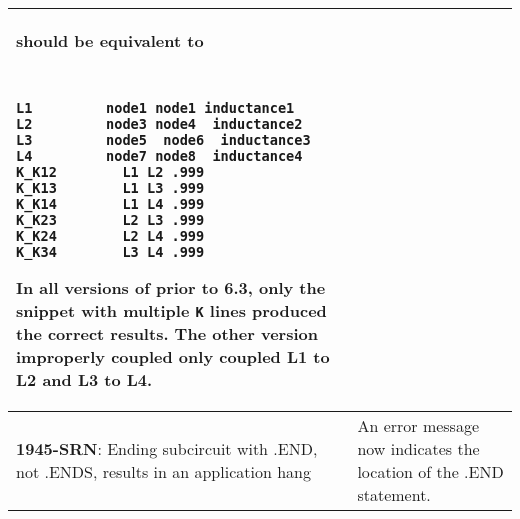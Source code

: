 \begin{longtable}[h] {>{\raggedright\small}m{2in}|>{\raggedright\let\\\tabularnewline\small}m{3.5in}}
should be equivalent to
{\tt
\begin{verbatim}
L1         node1 node1 inductance1
L2         node3 node4  inductance2
L3         node5  node6  inductance3
L4         node7 node8  inductance4
K_K12        L1 L2 .999
K_K13        L1 L3 .999 
K_K14        L1 L4 .999 
K_K23        L2 L3 .999 
K_K24        L2 L4 .999 
K_K34        L3 L4 .999 
\end{verbatim}
}

In all versions of \Xyce{} prior to 6.3, only the snippet with
multiple \texttt{K} lines produced the correct results.  The other
version improperly coupled only coupled L1 to L2 and L3 to L4.
\\ \hline

\textbf{1945-SRN}: Ending subcircuit with .END, not .ENDS, results in an application hang &  An error message now indicates the location of the .END statement. \\ \hline

\end{longtable}

